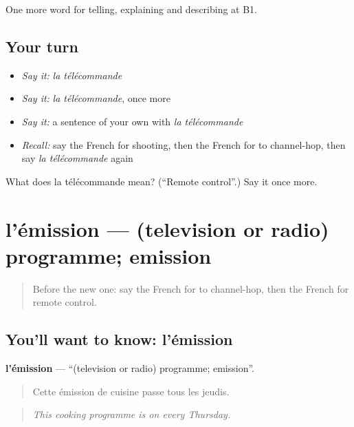\begin{grammarlens}[title={What you've built}]
One more word for telling, explaining and describing at B1.
\end{grammarlens}

\subsection*{Your turn}
\begin{itemize}
\raggedright
  \item \emph{Say it:} \emph{la télécommande}
  \item \emph{Say it:} \emph{la télécommande}, once more
  \item \emph{Say it:} a sentence of your own with \emph{la télécommande}
  \item \emph{Recall:} say the French for shooting, then the French for to channel-hop, then say \emph{la télécommande} again
\end{itemize}

\begin{tcolorbox}[breakable,colback=teal!4,colframe=teal!35!black,title={Before you move on}]
What does la télécommande mean? (\textquotedblleft{}Remote control\textquotedblright{}.) Say it once more.
\end{tcolorbox}
\section[l'émission]{l'émission — (television or radio) programme; emission}

\label{lesson:FR-C525-emission}



\begin{quote}
Before the new one: say the French for to channel-hop, then the French for remote control.
\end{quote}

\subsection*{You'll want to know: l'émission}
\textbf{l'émission} — \textquotedblleft{}(television or radio) programme; emission\textquotedblright{}.

\begin{quote}
Cette émission de cuisine passe tous les jeudis.
\end{quote}

\begin{quote}
\emph{This cooking programme is on every Thursday.}
\end{quote}

